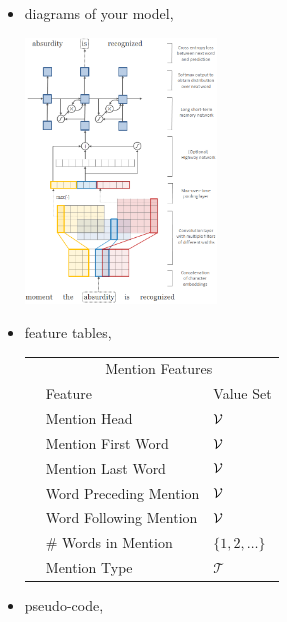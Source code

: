\documentclass[11pt]{article}
\begin{document}
\begin{itemize}
\item diagrams of your model,

  \begin{center}
    \includegraphics[width=0.4\textwidth]{network}
  \end{center}
\item feature tables,

  \begin{center}
    \begin{tabular}{@{}lll@{}}
      \toprule
      &\multicolumn{2}{c}{Mention Features  } \\
      & Feature & Value Set\\
      \midrule
      & Mention Head & $\mathcal{V}$ \\
      & Mention First Word & $\mathcal{V}$ \\
      & Mention Last Word & $\mathcal{V}$ \\
      & Word Preceding Mention & $\mathcal{V}$ \\
      & Word Following Mention & $\mathcal{V}$\\
      & \# Words in Mention & $\{1, 2, \ldots \}$ \\
      & Mention Type & $\mathcal{T}$ \\
      \bottomrule
    \end{tabular}
  \end{center}

\item pseudo-code,

  \begin{algorithmic}[1]
    \EndFor{}
    \EndFor{}
    \EndFor{}
    \EndFor{}
    \EndProcedure{}
  \end{algorithmic}

\end{itemize}
\end{document}

